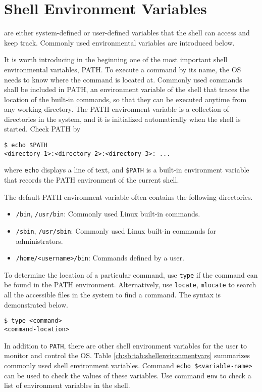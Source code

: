 {\section{Shell Environment Variables}\label{ch:sb:subsec:shellenvvar}

 are either system-defined or user-defined variables that the shell can access and keep track. Commonly used environmental variables are introduced below.

It is worth introducing in the beginning one of the most important shell environmental variables, PATH. To execute a command by its name, the OS needs to know where the command is located at. Commonly used commands shall be included in PATH, an environment variable of the shell that traces the location of the built-in commands, so that they can be executed anytime from any working directory. The PATH environment variable is a collection of directories in the system, and it is initialized automatically when the shell is started. Check PATH by
\begin{lstlisting}
$ echo $PATH
<directory-1>:<directory-2>:<directory-3>: ...
\end{lstlisting}
where \verb|echo| displays a line of text, and \verb|$PATH| is a built-in environment variable that records the PATH environment of the current shell. 

The default PATH environment variable often contains the following directories. 
\begin{itemize}
\item \verb|/bin|, \verb|/usr/bin|: Commonly used Linux built-in commands.
\item \verb|/sbin|, \verb|/usr/sbin|: Commonly used Linux built-in commands for administrators.
\item \verb|/home/<username>/bin|: Commands defined by a user.
\end{itemize}
To determine the location of a particular command, use \verb|type| if the command can be found in the PATH environment. Alternatively, use \verb|locate|, \verb|mlocate| to search all the accessible files in the system to find a command. The syntax is demonstrated below.
\begin{lstlisting}
$ type <command>
<command-location>
\end{lstlisting}

In addition to \verb|PATH|, there are other shell environment variables for the user to monitor and control the OS. Table \ref{ch:sb:tab:shellenvironmentvars} summarizes commonly used shell environment variables. Command \verb|echo $<variable-name>| can be used to check the values of these variables. Use command \verb|env| to check a list of environment variables in the shell.

}
